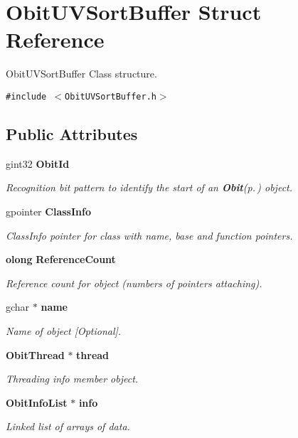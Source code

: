 \section{Obit\-UVSort\-Buffer Struct Reference}
\label{structObitUVSortBuffer}
Obit\-UVSort\-Buffer Class structure.  


{\tt \#include $<$Obit\-UVSort\-Buffer.h$>$}

\subsection*{Public Attributes}
\begin{CompactItemize}
\item 
gint32 {\bf Obit\-Id}
\begin{CompactList}\small\item\em Recognition bit pattern to identify the start of an {\bf Obit}{\rm (p.\,\pageref{structObit})} object. \item\end{CompactList}\item 
gpointer {\bf Class\-Info}
\begin{CompactList}\small\item\em Class\-Info pointer for class with name, base and function pointers. \item\end{CompactList}\item 
{\bf olong} {\bf Reference\-Count}
\begin{CompactList}\small\item\em Reference count for object (numbers of pointers attaching). \item\end{CompactList}\item 
gchar $\ast$ {\bf name}
\begin{CompactList}\small\item\em Name of object [Optional]. \item\end{CompactList}\item 
{\bf Obit\-Thread} $\ast$ {\bf thread}
\begin{CompactList}\small\item\em Threading info member object. \item\end{CompactList}\item 
{\bf Obit\-Info\-List} $\ast$ {\bf info}
\begin{CompactList}\small\item\em Linked list of arrays of data. \item\end{CompactList}\item 

\end{CompactItemize}
